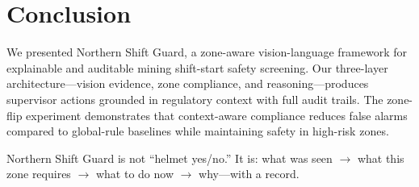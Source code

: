 \section{Conclusion}
\label{sec:conclusion}

We presented Northern Shift Guard, a zone-aware vision-language framework for explainable and auditable mining shift-start safety screening. Our three-layer architecture---vision evidence, zone compliance, and reasoning---produces supervisor actions grounded in regulatory context with full audit trails. The zone-flip experiment demonstrates that context-aware compliance reduces false alarms compared to global-rule baselines while maintaining safety in high-risk zones.

Northern Shift Guard is not ``helmet yes/no.'' It is: what was seen $\rightarrow$ what this zone requires $\rightarrow$ what to do now $\rightarrow$ why---with a record.
